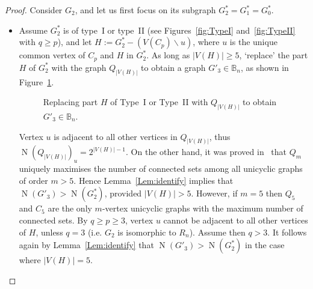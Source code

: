 \documentclass[a4paper,12pt]{amsart}
\theoremstyle{remark}
\DeclareMathOperator{\N}{N}
\begin{document}
\begin{proof}
\medskip
Consider $G_2$, and let us first focus on its subgraph $G_2^*=G_1^*=G_0^*$.
\begin{itemize}
\item Assume $G_2^*$ is of type~I or type~II (see Figures~\ref{fig:TypeI} and~\ref{fig:TypeII} with $q\geq p$), and let $H:=G_2^* - (V(C_p) \backslash u)$, where $u$ is the unique common vertex of $C_p$ and $H$ in $G_2^*$. As long as $|V(H)|\geq 5$, `replace' the part $H$ of $G_2^*$ with the graph $Q_{|V(H)|}$ to obtain a graph $G'_3\in \mathbb{B}_n$, as shown in Figure~\ref{fig:TypeIorIItoQ}.
\begin{figure}[h]
	\begin{center}
	\end{center}
	\caption{Replacing part $H$ of Type~I or Type~II with $Q_{|V(H)|}$ to obtain $G'_3\in \mathbb{B}_n$.} \label{fig:TypeIorIItoQ}
\end{figure}
Vertex $u$ is adjacent to all other vertices in $Q_{|V(H)|}$, thus $\N(Q_{|V(H)|})_u=2^{|V(H)| -1}$. On the other hand, it was proved in~\cite{Audacegenral2018} that $Q_m$ uniquely maximises the number of connected sets among all unicyclic graphs of order $m>5$. Hence Lemma~\ref{Lem:identify} implies that $\N(G'_3) > \N(G^*_2)$, provided $|V(H)|>5$. However, if $m=5$ then $Q_5$ and $C_5$ are the only $m$-vertex unicyclic graphs with the maximum number of connected sets. By $q\geq p \geq 3$, vertex $u$ cannot be adjacent to all other vertices of $H$, unless $q=3$ (i.e. $G_2$ is isomorphic to $R_n$). Assume then $q>3$. It follows again by Lemma~\ref{Lem:identify} that $\N(G'_3) > \N(G^*_2)$ in the case where $|V(H)|=5$.


\end{itemize}
\end{proof}
\end{document}

